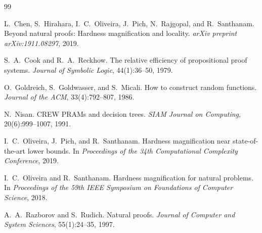 \documentclass[11pt]{article}
\theoremstyle{definition}
\begin{document}
\begin{thebibliography}{99}

L.~Chen, S.~Hirahara, I.~C.~Oliveira, J.~Pich, N.~Rajgopal, and R.~Santhanam.
\newblock Beyond natural proofs: Hardness magnification and locality.
\newblock \emph{arXiv preprint arXiv:1911.08297}, 2019.

S.~A.~Cook and R.~A.~Reckhow.
\newblock The relative efficiency of propositional proof systems.
\newblock \emph{Journal of Symbolic Logic}, 44(1):36--50, 1979.

O.~Goldreich, S.~Goldwasser, and S.~Micali.
\newblock How to construct random functions.
\newblock \emph{Journal of the ACM}, 33(4):792--807, 1986.

N.~Nisan.
\newblock CREW PRAMs and decision trees.
\newblock \emph{SIAM Journal on Computing}, 20(6):999--1007, 1991.

I.~C.~Oliveira, J.~Pich, and R.~Santhanam.
\newblock Hardness magnification near state-of-the-art lower bounds.
\newblock In \emph{Proceedings of the 34th Computational Complexity Conference}, 2019.

I.~C.~Oliveira and R.~Santhanam.
\newblock Hardness magnification for natural problems.
\newblock In \emph{Proceedings of the 59th IEEE Symposium on Foundations of Computer Science}, 2018.

A.~A.~Razborov and S.~Rudich.
\newblock Natural proofs.
\newblock \emph{Journal of Computer and System Sciences}, 55(1):24--35, 1997.

\end{thebibliography}
\end{document}
